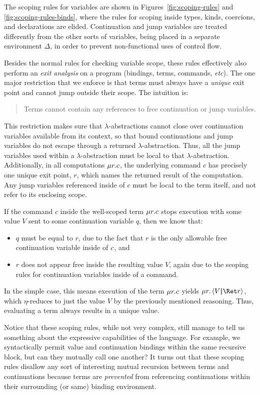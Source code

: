 \documentclass{article}
\begin{document}
The scoping rules for variables are shown in Figures~\ref{fig:scoping-rules} and
\ref{fig:scoping-rules-binds}, where the rules for scoping inside types, kinds,
coercions, and declarations are elided.  Continuation and jump variables are
treated differently from the other sorts of variables, being placed in a
separate environment $\Delta$, in order to prevent non-functional uses of
control flow.

Besides the normal rules for checking variable scope, these rules effectively
also perform an \emph{exit analysis} on a program (bindings, terms, commands,
\emph{etc}).  The one major restriction that we enforce is that terms must
always have a \emph{unique} exit point and cannot jump outside their scope.  The
intuition is:
\begin{quote}
  Terms cannot contain any references to free continuation or jump variables.
\end{quote}
This restriction makes sure that $\lambda$-abstractions cannot close over
continuation variables available from its context, so that bound continuations
and jump variables do not escape through a returned $\lambda$-abstraction.
Thus, all the jump variables used within a $\lambda$-abstraction must be local
to that $\lambda$-abstraction.  Additionally, in all computations
$\mu{r}.c$, the underlying command $c$ has precisely one unique exit point,
$r$, which names the returned result of the computation.  Any jump variables
referenced inside of $c$ must be local to the term itself, and not refer to its
enclosing scope.

If the command $c$ inside the well-scoped term $\mu{r}.c$ stops execution
with some value $V$ sent to some continuation variable $q$, then we know that:
\begin{itemize}
\item $q$ must be equal to $r$, due to the fact that $r$ is the only allowable
  free continuation variable inside of $c$, and
\item $r$ does not appear free inside the resulting value $V$, again due to the
  scoping rules for continuation variables inside of a command.
\end{itemize}
In the simple case, this means execution of the term $\mu{r}.c$ yields
$\comp{r}\cut{V}{\ret r}$, which $\eta$-reduces to just the value $V$ by the
previously mentioned reasoning.  Thus, evaluating a term always results in a
unique value.

Notice that these scoping rules, while not very complex, still manage to tell us
something about the expressive capabilities of the language.  For example, we
syntactically permit value and continuation bindings within the same recursive
block, but can they mutually call one another?  It turns out that these scoping
rules disallow any sort of interesting mutual recursion between terms and
continuations because terms are \emph{prevented} from referencing continuations
within their surrounding (or same) binding environment.
\end{document}
